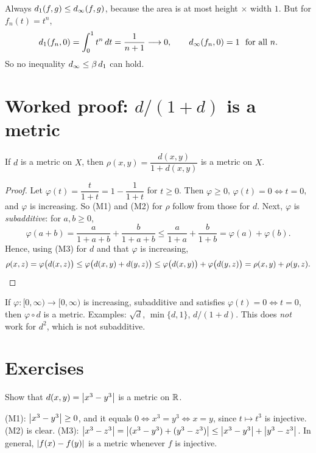 \begin{example}\label{ex:tn}
Always $d_1(f,g)\le d_\infty(f,g)$, because the area is at most height $\times$ width $1$. But for $f_n(t)=t^n$,
\[
  d_1(f_n,0)=\int_0^1t^n\,dt=\frac1{n+1}\longrightarrow0,
  \qquad
  d_\infty(f_n,0)=1\ \text{ for all } n .
\]
So no inequality $d_\infty\le\beta\,d_1$ can hold.
\end{example}

\section{Worked proof: $d/(1+d)$ is a metric}
\begin{proposition}\label{prop:d1d}
If $d$ is a metric on $X$, then $\rho(x,y)=\dfrac{d(x,y)}{1+d(x,y)}$ is a metric on $X$.
\end{proposition}
\begin{proof}
Let $\varphi(t)=\dfrac{t}{1+t}=1-\dfrac1{1+t}$ for $t\ge0$. Then $\varphi\ge0$, $\varphi(t)=0\iff t=0$, and $\varphi$ is increasing. So \textup{(M1)} and \textup{(M2)} for $\rho$ follow from those for $d$. Next, $\varphi$ is \emph{subadditive}: for $a,b\ge0$,
\[
  \varphi(a+b)=\frac{a}{1+a+b}+\frac{b}{1+a+b}\le\frac{a}{1+a}+\frac{b}{1+b}=\varphi(a)+\varphi(b).
\]
Hence, using \textup{(M3)} for $d$ and that $\varphi$ is increasing,
\[
  \rho(x,z)=\varphi\bigl(d(x,z)\bigr)\le\varphi\bigl(d(x,y)+d(y,z)\bigr)\le\varphi\bigl(d(x,y)\bigr)+\varphi\bigl(d(y,z)\bigr)=\rho(x,y)+\rho(y,z). \qedhere
\]
\end{proof}

\begin{remark}
If $\varphi\colon[0,\infty)\to[0,\infty)$ is increasing, subadditive and satisfies $\varphi(t)=0\iff t=0$, then $\varphi\circ d$ is a metric. Examples: $\sqrt{d}$, $\min\{d,1\}$, $d/(1+d)$. This does \emph{not} work for $d^2$, which is not subadditive.
\end{remark}

\section{Exercises}
\begin{exercise}\easy
Show that $d(x,y)=\left\lvert x^3-y^3\right\rvert$ is a metric on $\mathbb{R}$.
\end{exercise}
\begin{solution}
\textup{(M1)}: $\left\lvert x^3-y^3\right\rvert\ge0$, and it equals $0\iff x^3=y^3\iff x=y$, since $t\mapsto t^3$ is injective. \textup{(M2)} is clear. \textup{(M3)}: $\left\lvert x^3-z^3\right\rvert=\left\lvert (x^3-y^3)+(y^3-z^3)\right\rvert\le\left\lvert x^3-y^3\right\rvert+\left\lvert y^3-z^3\right\rvert$. In general, $\left\lvert f(x)-f(y)\right\rvert$ is a metric whenever $f$ is injective.
\end{solution}

